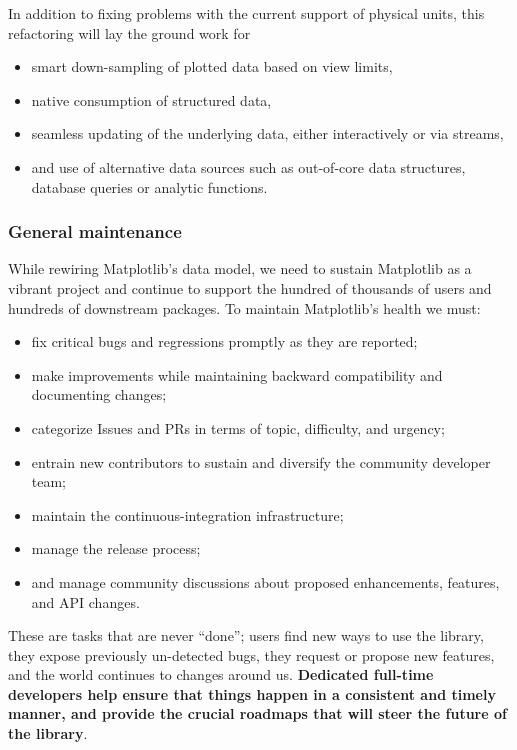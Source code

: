 \documentclass[12pt]{article}
\numberwithin{page}{section}
\begin{document}
In addition to fixing problems with the current
support of physical units, this refactoring will lay the ground work for
\begin{itemize}[noitemsep]
  \item smart down-sampling of plotted data based on view limits,
  \item native consumption of structured data,
  \item seamless updating of the underlying data, either interactively
    or via streams,
  \item and use of alternative data sources such as out-of-core data
    structures, database queries or analytic functions.
\end{itemize}

\subsubsection{General maintenance}

While rewiring Matplotlib's data model,
we need to sustain Matplotlib as a vibrant project and
continue to support the hundred of thousands of users and hundreds of
downstream packages.  To maintain Matplotlib's health we must:
\begin{itemize}[noitemsep]
\item fix critical bugs and regressions promptly as they are reported;
\item make improvements while maintaining backward compatibility and
  documenting changes;
\item categorize Issues and PRs in terms of topic, difficulty, and
  urgency;
\item entrain new contributors to sustain and diversify the community
  developer team;
\item maintain the continuous-integration infrastructure;
\item manage the release process;
\item and manage community discussions about proposed enhancements, features,
  and API changes.
\end{itemize}
These are tasks that are never ``done''; users find new ways to use
the library, they expose previously un-detected bugs, they request or propose new
features, and the world continues to changes around us.   \textbf{Dedicated
full-time developers help ensure that things happen in a consistent and timely
manner, and provide the crucial roadmaps that will steer the future of the library}.


\end{document}

